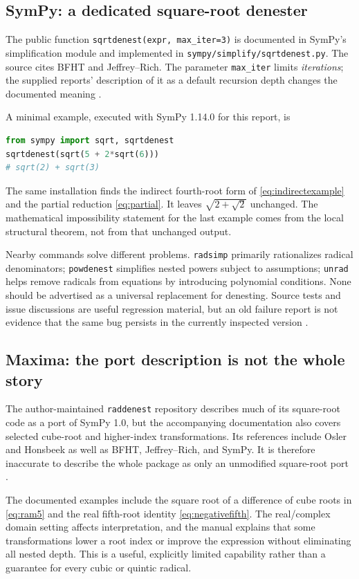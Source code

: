 \documentclass[11pt,letterpaper]{article}
\numberwithin{equation}{section}
\theoremstyle{definition}
\theoremstyle{remark}
\begin{document}
\subsection{SymPy: a dedicated square-root denester}
The public function \texttt{sqrtdenest(expr, max\_iter=3)} is documented in SymPy's simplification module and implemented in \texttt{sympy/simplify/sqrtdenest.py}. The source cites BFHT and Jeffrey--Rich. The parameter \texttt{max\_iter} limits \emph{iterations}; the supplied reports' description of it as a default recursion depth changes the documented meaning \cite{sympy,sympysource}.

A minimal example, executed with SymPy 1.14.0 for this report, is
\begin{lstlisting}[language=Python]
from sympy import sqrt, sqrtdenest
sqrtdenest(sqrt(5 + 2*sqrt(6)))
# sqrt(2) + sqrt(3)
\end{lstlisting}
The same installation finds the indirect fourth-root form of \eqref{eq:indirectexample} and the partial reduction \eqref{eq:partial}. It leaves $\sqrt{2+\sqrt2}$ unchanged. The mathematical impossibility statement for the last example comes from the local structural theorem, not from that unchanged output.

Nearby commands solve different problems. \texttt{radsimp} primarily rationalizes radical denominators; \texttt{powdenest} simplifies nested powers subject to assumptions; \texttt{unrad} helps remove radicals from equations by introducing polynomial conditions. None should be advertised as a universal replacement for denesting. Source tests and issue discussions are useful regression material, but an old failure report is not evidence that the same bug persists in the currently inspected version \cite{sympy,sympysource,sympyissues}.

\subsection{Maxima: the port description is not the whole story}
The author-maintained \texttt{raddenest} repository describes much of its square-root code as a port of SymPy 1.0, but the accompanying documentation also covers selected cube-root and higher-index transformations. Its references include Osler and Honsbeek as well as BFHT, Jeffrey--Rich, and SymPy. It is therefore inaccurate to describe the whole package as only an unmodified square-root port \cite{maxima}.

The documented examples include the square root of a difference of cube roots in \eqref{eq:ram5} and the real fifth-root identity \eqref{eq:negativefifth}. The real/complex domain setting affects interpretation, and the manual explains that some transformations lower a root index or improve the expression without eliminating all nested depth. This is a useful, explicitly limited capability rather than a guarantee for every cubic or quintic radical.
\end{document}
